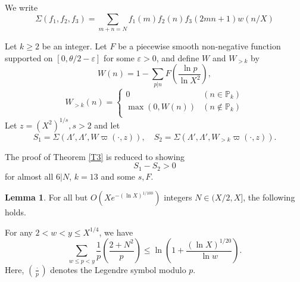 \documentclass{amsart}
\theoremstyle{definition}
\newtheorem{lem}[dfn]{Lemma}
\theoremstyle{remark}
\newcommand{\1}{
    \bm{1}
}
\begin{document}
We write
\[ \Sigma(f_1,f_2,f_3) = \sum_{m+n=N} f_1(m) f_2(n) f_3(2mn+1) w(n/X) \]


Let $k \geq 2$ be an integer.
Let $F$ be a piecewise smooth non-negative function supported on $[0,\theta/2-\varepsilon]$ for some $\varepsilon>0$, and define $W$ and $W_{>k}$ by
\[ W(n) = 1-\sum_{p|n} F\left(\frac{\ln{p}}{\ln{X^2}}\right), \]
\[ W_{>k}(n) = 
\begin{cases}
0 & (n \in \mathbb{P}_k)  \\
\max(0,W(n)) & (n \notin \mathbb{P}_k) \\
\end{cases} \]
Let $z=(X^{2})^{1/s}, s>2$ and let
\[ S_1 = \Sigma(\Lambda',\Lambda',W \varpi(\cdot,z)), \quad S_2 = \Sigma(\Lambda',\Lambda',W_{>k}\varpi(\cdot,z)). \]

The proof of Theorem \ref{T3} is reduced to showing
\[ S_1 - S_2 > 0 \]
for almost all $6|N$, $k=13$ and some $s,F$. 





\begin{lem}\label{Ldim1}
For all but $O(X e^{-(\ln{X})^{1/100}})$ integers $N \in (X/2,X]$, the following holds. 

For any $2<w<y \leq X^{1/4}$, we have
\begin{equation} \sum_{w \leq p < y} \frac{1}{p} \left( \frac{2+N^2}{p} \right) \leq \ln{\left( 1+ \frac{(\ln{X})^{1/20}}{\ln{w}} \right)}. \label{Ldim1eq} \end{equation}
Here, $\left( \frac{\cdot}{p} \right)$ denotes the Legendre symbol modulo $p$.
\end{lem}
\end{document}
